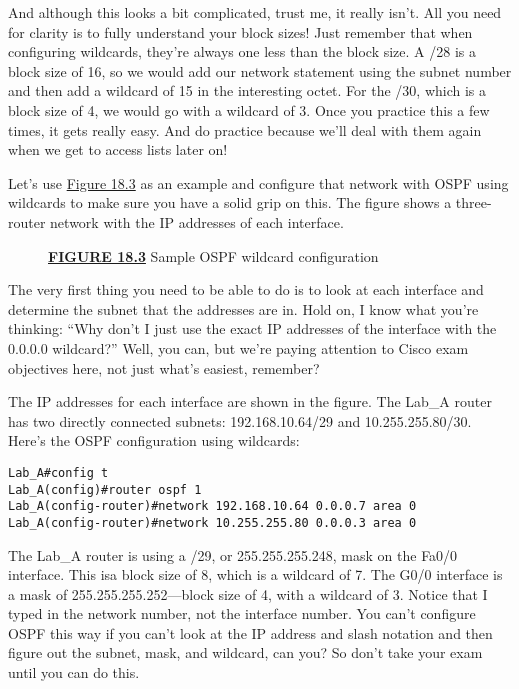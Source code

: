 And although this looks a bit complicated, trust me, it really isn't.
All you need for clarity is to fully understand your block sizes! Just
remember that when configuring wildcards, they're always one less than
the block size. A /28 is a block size of 16, so we would add our network
statement using the subnet number and then add a wildcard of 15 in the
interesting octet. For the /30, which is a block size of 4, we would go
with a wildcard of 3. Once you practice this a few times, it gets really
easy. And do practice because we'll deal with them again when we get to
access lists later on!

Let's use \protect\hyperlink{c18.xhtmlux5cux23figure18-3}{Figure 18.3}
as an example and configure that network with OSPF using wildcards to
make sure you have a solid grip on this. The figure shows a three-router
network with the IP addresses of each interface.

\begin{figure}
\centering
\caption{{\protect\hyperlink{c18.xhtmlux5cux23figureanchor18-3}{\textbf{FIGURE
18.3}} Sample OSPF wildcard configuration}}
\end{figure}

The very first thing you need to be able to do is to look at each
interface and determine the subnet that the addresses are in. Hold on, I
know what you're thinking: ``Why don't I just use the exact IP addresses
of the interface with the 0.0.0.0 wildcard?'' Well, you can, but we're
paying attention to Cisco exam objectives here, not just what's easiest,
remember?

\protect\hypertarget{c18.xhtmlux5cux23Page_757}{}{}The IP addresses for
each interface are shown in the figure. The Lab\_A router has two
directly connected subnets: 192.168.10.64/29 and 10.255.255.80/30.
Here's the OSPF configuration using wildcards:

\begin{verbatim}
Lab_A#config t
Lab_A(config)#router ospf 1
Lab_A(config-router)#network 192.168.10.64 0.0.0.7 area 0
Lab_A(config-router)#network 10.255.255.80 0.0.0.3 area 0
\end{verbatim}

The Lab\_A router is using a /29, or 255.255.255.248, mask on the Fa0/0
interface. This isa block size of 8, which is a wildcard of 7. The G0/0
interface is a mask of 255.255.255.252---block size of 4, with a
wildcard of 3. Notice that I typed in the network number, not the
interface number. You can't configure OSPF this way if you can't look at
the IP address and slash notation and then figure out the subnet, mask,
and wildcard, can you? So don't take your exam until you can do this.


